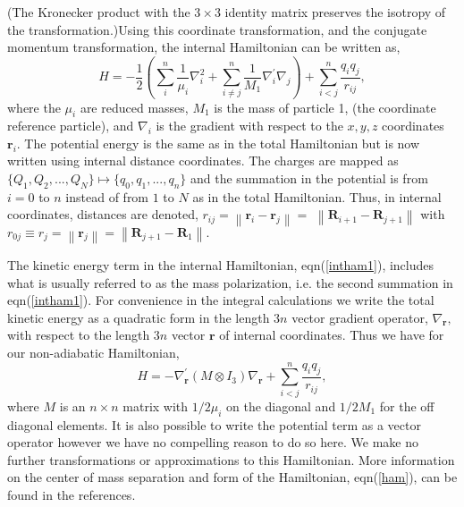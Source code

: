 \documentclass[12pt]{article}
\begin{document}
(The Kronecker product with the $3\times3$ identity matrix preserves the
isotropy of the transformation.)Using this coordinate transformation, and the
conjugate momentum transformation, the internal Hamiltonian can be written
as,
\begin{equation}
H=-\frac{1}{2}\left(  \sum_{i}^{n}\frac{1}{\mu_{i}}\nabla_{i}^{2}+\sum_{i\neq
j}^{n}\frac{1}{M_{1}}\nabla_{i}^{\prime}\nabla_{j}\right)  +\sum_{i<j}%
^{n}\frac{q_{i}q_{j}}{r_{ij}},\label{intham1}%
\end{equation}
where the $\mu_{i}$ are reduced masses, $M_{1}$ is the mass of particle 1,
(the coordinate reference particle), and $\nabla_{i}$ is the gradient with
respect to the $x,y,z$ coordinates $\mathbf{r}_{i}$. The potential energy is
the same as in the total Hamiltonian but is now written using internal
distance coordinates. The charges are mapped as $\{Q_{1},Q_{2},...,Q_{N}%
\}\mapsto\{q_{0},q_{1},...,q_{n}\}$ and the summation in the potential is from
$i=0$ to $n$ instead of from $1$ to $N$ as in the total Hamiltonian. Thus, in
internal coordinates, distances are denoted, $r_{ij}=\left\|  \mathbf{r}%
_{i}-\mathbf{r}_{j}\right\|  =$ $\left\|  \mathbf{R}_{i+1}-\mathbf{R}%
_{j+1}\right\|  \,\,$with\thinspace$r_{0j}\equiv r_{j}=\left\|  \mathbf{r}%
_{j}\right\|  =\left\|  \mathbf{R}_{j+1}-\mathbf{R}_{1}\right\|  .$

The kinetic energy term in the internal Hamiltonian, eqn(\ref{intham1}),
includes what is usually referred to as the mass polarization, i.e. the second
summation in eqn(\ref{intham1}). For convenience in the integral calculations
we write the total kinetic energy as a quadratic form in the length $3n$
vector gradient operator, $\nabla_{\mathbf{r}},$ with respect to the length
$3n$ vector $\mathbf{r}$ of internal coordinates. Thus we have for our
non-adiabatic Hamiltonian,
\begin{equation}
H=-\nabla_{\mathbf{r}}^{\prime}\left(  M\otimes I_{3}\right)  \nabla
_{\mathbf{r}}+\sum_{i<j}^{n}\frac{q_{i}q_{j}}{r_{ij}},\label{ham}%
\end{equation}
where $M$ is an $n\times n$ matrix with $1/2\mu_{i}$ on the diagonal and
$1/2M_{1}$ for the off diagonal elements. It is also possible to write the
potential term as a vector operator\cite{Kinghorn95a} however we have no
compelling reason to do so here. We make no further transformations or
approximations to this Hamiltonian. More information on the center of mass
separation and form of the Hamiltonian, eqn(\ref{ham}), can be found in the
references\cite{Kinghorn93,Kinghorn95b}.\qquad\ 
\end{document}
